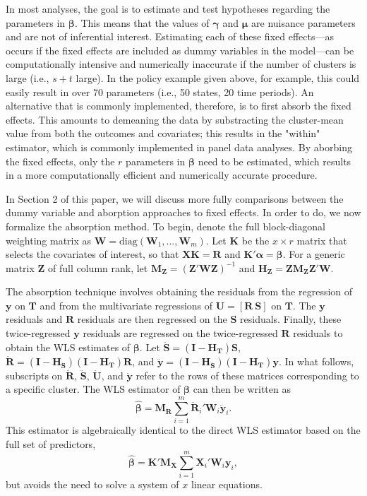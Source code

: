 \documentclass[12pt]{article}\usepackage[]{graphicx}\usepackage[]{color}
\newcommand{\bm}{\mathbf}
\newcommand{\bs}{\boldsymbol}
\begin{document}
In most analyses, the goal is to estimate and test hypotheses regarding the parameters in $\bs\beta$. 
This means that the values of $\bs\gamma$ and $\bs\mu$ are nuisance parameters and are not of inferential interest. 
Estimating each of these fixed effects---as occurs if the fixed effects are included as dummy variables in the model---can be computationally intensive and numerically inaccurate if the number of clusters is large (i.e., $s + t$ large). 
In the policy example given above, for example, this could easily result in over 70 parameters (i.e., 50 states, 20 time periods).
An alternative that is commonly implemented, therefore, is to first absorb the fixed effects. 
This amounts to demeaning the data by substracting the cluster-mean value from both the outcomes and covariates; this results in the "within" estimator, which is commonly implemented in panel data analyses. 
By aborbing the fixed effects, only the $r$ parameters in $\bs\beta$ need to be estimated, which results in a more computationally efficient and numerically accurate procedure. 

In Section 2 of this paper, we will discuss more fully comparisons between the dummy variable and aborption approaches to fixed effects. 
In order to do, we now formalize the absorption method.
To begin, denote the full block-diagonal weighting matrix as $\bm{W} = \text{diag}\left(\bm{W}_1,...,\bm{W}_m\right)$.
Let $\bm{K}$ be the $x \times r$ matrix that selects the covariates of interest, so that $\bm{X} \bm{K} = \bm{R}$ and $\bm{K}'\bs\alpha = \bs\beta$.
For a generic matrix $\bm{Z}$ of full column rank, let $\bm{M_Z} = \left(\bm{Z}'\bm{W}\bm{Z}\right)^{-1}$ and $\bm{H_Z} = \bm{Z}\bm{M_Z}\bm{Z}'\bm{W}$. 

The absorption technique involves obtaining the residuals from the regression of $\bm{y}$ on $\bm{T}$ and from the multivariate regressions of $\bm{U} = [\bm{R}\ \bm{S}]$ on $\bm{T}$. 
The $\bm{y}$ residuals and $\bm{R}$ residuals are then regressed on the $\bm{S}$ residuals. 
Finally, these twice-regressed $\bm{y}$ residuals are regressed on the twice-regressed $\bm{R}$ residuals to obtain the WLS estimates of $\bs\beta$. 
Let $\bm{\ddot{S}} = \left(\bm{I} - \bm{H_T}\right)\bm{S}$, $\bm{\ddot{R}} = \left(\bm{I} - \bm{H_{\ddot{S}}}\right)\left(\bm{I} - \bm{H_T}\right)\bm{R}$, and $\bm{\ddot{y}} = \left(\bm{I} - \bm{H_{\ddot{S}}}\right)\left(\bm{I} - \bm{H_T}\right)\bm{y}$. 
In what follows, subscripts on $\bm{\ddot{R}}$, $\bm{\ddot{S}}$,  $\bm{\ddot{U}}$, and $\bm{\ddot{y}}$ refer to the rows of these matrices corresponding to a specific cluster. 
The WLS estimator of $\bs\beta$ can then be written as
\begin{equation}
\label{eq:WLS}
\bs{\hat\beta} = \bm{M_{\ddot{R}}} \sum_{i=1}^m \bm{\ddot{R}}_i' \bm{W}_i \bm{\ddot{y}}_i. 
\end{equation}
This estimator is algebraically identical to the direct WLS estimator based on the full set of predictors, \[
\bs{\hat\beta} = \bm{K}'\bm{M_X} \sum_{i=1}^m \bm{X}_i' \bm{W}_i \bm{y}_i,
\]
but avoids the need to solve a system of $x$ linear equations.
\end{document}
